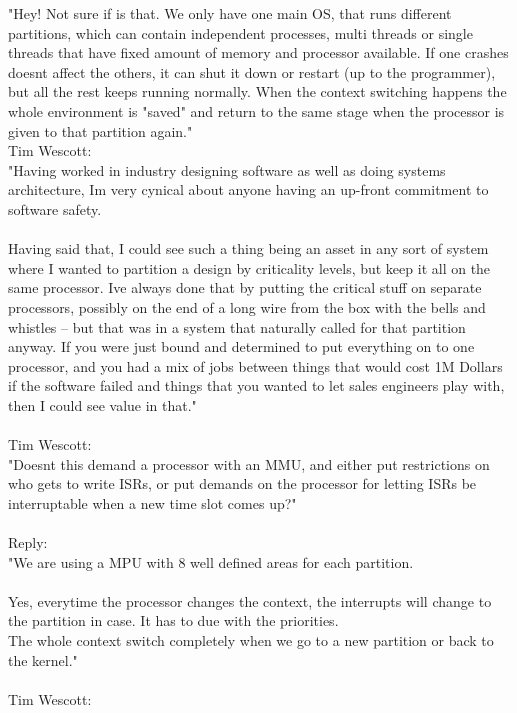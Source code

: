 "Hey! Not sure if is that. We only have one main OS, that runs different partitions, which can contain 
independent processes, multi threads or single threads that have fixed amount of memory and processor 
available. If one crashes doesn\textquotesingle t affect the others, it can shut it down or restart (up to the 
programmer), but all the rest keeps running normally. When the context switching happens the whole 
environment is "saved" and return to the same stage when the processor is given to that partition again."
\\
Tim Wescott:\\

"Having worked in industry designing software as well as doing systems architecture, I\textquotesingle m very cynical 
about anyone having an up-front commitment to software safety.\\
\\
Having said that, I could see such a thing being an asset in any sort of system where I wanted to 
partition a design by criticality levels, but keep it all on the same processor.  I\textquotesingle ve always done that by 
putting the critical stuff on separate processors, possibly on the end of a long wire from the box with 
the bells and whistles -- but that was in a system that naturally called for that partition anyway.  If 
you were just bound and determined to put everything on to one processor, and you had a mix of jobs 
between things that would cost 1M Dollars if the software failed and things that you wanted to let sales 
engineers play with, then I could see value in that."\\
\\
Tim Wescott:\\

"Doesn\textquotesingle t this demand a processor with an MMU, and either put restrictions on who gets to write ISRs, or 
put demands on the processor for letting ISRs be interruptable when a new time slot comes up?"\\
\\
Reply:\\

"We are using a MPU with 8 well defined areas for each partition.\\
\\

Yes, everytime the processor changes the context, the interrupts will change to the partition in case. It 
has to due with the priorities.\\
The whole context switch completely when we go to a new partition or back to the kernel."\\
\\
Tim Wescott:\\

